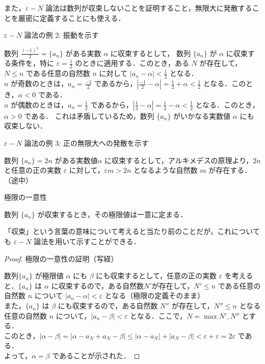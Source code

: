 \documentclass[a4paper]{ltjsarticle}
\begin{document}
また，$\varepsilon - N$ 論法は数列が収束しないことを証明すること，無限大に発散することを厳密に定義することにも使える．
\begin{tcb}{$ \varepsilon - N$ 論法の例 2: 振動を示す}{}

数列 $\frac{(-1)^n}{2} = \{a_n\}$ がある実数 $\alpha$ に収束するとして，
数列 $\{a_n\}$ が $\alpha$ に収束する条件を，特に $\varepsilon = \frac{1}{2}$ のときに適用する．このとき，ある $N$ が存在して，$N \leq n$ である任意の自然数 $n$ に対して $|a_n - \alpha| < \frac{1}{2}$ となる．
\\
$n$ が奇数のときは，$a_n = \frac{-1}{2}$ であるから，$|\frac{-1}{2} - \alpha| = \frac{1}{2} + \alpha < \frac{1}{2}$ となる．このとき，$\alpha < 0$ である．
\\
$n$ が偶数のときは，$a_n = \frac{1}{2}$ であるから，$|\frac{1}{2} - \alpha| = \frac{1}{2} - \alpha < \frac{1}{2}$ となる．このとき，$\alpha > 0$ である．
これは矛盾しているため，数列 $\{a_n\}$ がいかなる実数値 $\alpha$ にも収束しない．

\end{tcb}

\begin{tcb}{$ \varepsilon - N$ 論法の例 3: 正の無限大への発散を示す}{}

数列 $\{a_n\} = 2n$ がある実数値$ \alpha$ に収束するとして，アルキメデスの原理より，$2n$ と任意の正の実数 $\varepsilon$ に対して，$\varepsilon m > 2n$ となるような自然数 $m$ が存在する． （途中）

\end{tcb}

\begin{theorem}{極限の一意性}{}

数列 $\{a_n\}$ が収束するとき，その極限値は一意に定まる．

\end{theorem}

「収束」という言葉の意味について考えると当たり前のことだが，これについても $\varepsilon - N$ 論法を用いて示すことができる．

\pagebreak

\begin{proof}{極限の一意性の証明（写経）}{}

数列$\{a_n\}$ が極限値 $\alpha$ にも $\beta$ にも収束するとして，任意の正の実数 $\varepsilon$ を考えると．$\{a_n\}$ は $\alpha$ に収束するので，ある自然数$N'$が存在して，$N' \leq n$ である任意の自然数 $n$ について $|a_n - \alpha| < \varepsilon$ となる（極限の定義そのまま）
\\
また，$\{a_n\}$ は $\beta$ にも収束するので，ある自然数 $N''$ が存在して，$N'' \leq  n$ となる任意の自然数 $n$ について，$|a_n - \beta| < \varepsilon$ となる．ここで，$N = \max { N', N''}$ とする．
\\
このとき，$|\alpha - \beta| = |\alpha - a_N + a_N - \beta| \leq |\alpha - a_N| + |a_N - \beta| < \varepsilon + \varepsilon = 2\varepsilon$ である．
\\
よって，$\alpha = \beta$ であることが示された．

\end{proof}
\end{document}
